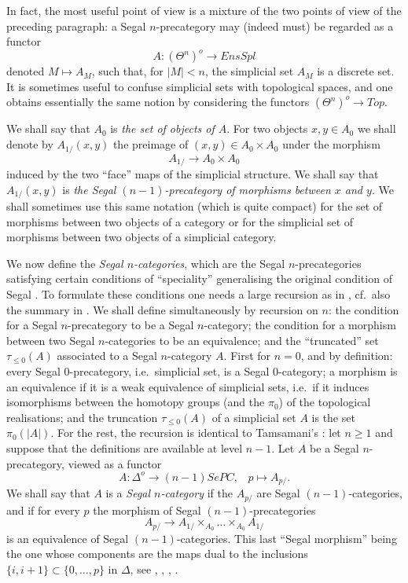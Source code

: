 In fact, the most useful point of view is a mixture of the two points of view
of the preceding paragraph: a Segal $n$-precategory may (indeed must) be
regarded as a functor
$$
A: (\Theta ^n)^o\rightarrow EnsSpl
$$
denoted $M\mapsto A_M$, such that, for $|M| < n$, the simplicial set $A_M$
is a discrete set. It is sometimes useful to confuse simplicial sets with
topological spaces, and one obtains essentially the same notion by considering
the functors $(\Theta ^n)^o\rightarrow Top$.

We shall say that $A_0$ is {\em the set of objects of $A$}. For two objects
$x,y\in A_0$
we shall denote by $A_{1/}(x,y)$ the preimage of $(x,y)\in A_0\times A_0$ under
the morphism
$$
A_{1/}\rightarrow A_0\times A_0
$$
induced by the two ``face'' maps of the simplicial structure.
We shall say that $A_{1/}(x,y)$ is {\em the Segal $(n-1)$-precategory of
morphisms between $x$
and $y$}. We shall sometimes use this same notation (which is quite compact)
for the set of morphisms between two objects of a category or for the
simplicial set of morphisms between two objects of a simplicial category.


We now define the {\em
Segal $n$-categories}, which are the Segal $n$-precategories satisfying
certain conditions of ``speciality'' generalising the original condition
of Segal \cite{Segal}. To formulate these conditions one needs a large
recursion as in \cite{Tamsamani}, cf.\ also the summary in
\cite{limits}. We shall define simultaneously by recursion on $n$: the
condition for a Segal $n$-precategory to be a Segal $n$-category; the
condition for a morphism between two Segal $n$-categories to be an
equivalence; and the ``truncated'' set
$\tau _{\leq 0}(A)$ associated to a
Segal $n$-category $A$. First for $n=0$, and by definition:
every Segal $0$-precategory, i.e.\
simplicial set, is a Segal $0$-category; a morphism is an
equivalence if it is a weak equivalence of simplicial sets, i.e.\
if it induces isomorphisms between the homotopy groups (and the $\pi
_0$) of the
topological realisations; and the truncation $\tau _{\leq 0}(A)$ of a
simplicial set $A$ is the set $\pi _0(|A|)$. For the rest, the recursion is
identical to Tamsamani's \cite{Tamsamani}: let $n\geq 1$ and suppose
that the definitions are available at level $n-1$. Let $A$ be a
Segal $n$-precategory, viewed as a functor
$$
A: \Delta ^o\rightarrow (n-1)SePC,\;\;\; p\mapsto A_{p/}.
$$
We shall say that $A$ is a {\em Segal $n$-category} if the
$A_{p/}$ are Segal $(n-1)$-categories, and if for every $p$ the morphism
of Segal $(n-1)$-precategories
$$
A_{p/}\rightarrow A_{1/}\times _{A_0} \ldots \times _{A_0}A_{1/}
$$
is an equivalence of Segal $(n-1)$-categories. This last
``Segal morphism'' being the one whose components are the maps
dual to the inclusions $\{ i,i+1\} \subset \{ 0,\ldots , p\}$ in $\Delta$,
see \cite{SegalInventiones}, \cite{Adams}, \cite{Dunn}, \cite{Tamsamani}.


